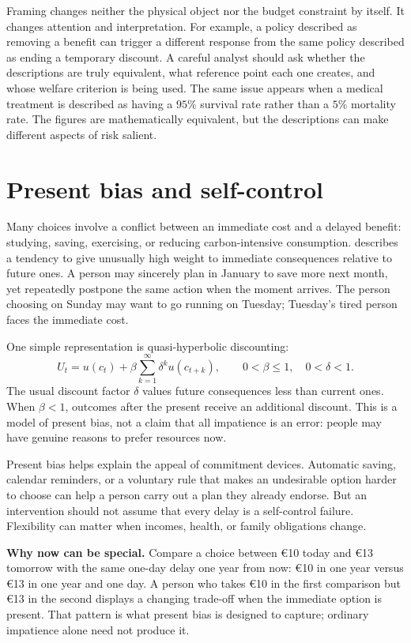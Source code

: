 Framing changes neither the physical object nor the budget constraint by
itself. It changes attention and interpretation. For example, a policy
described as removing a benefit can trigger a different response from the
same policy described as ending a temporary discount. A careful analyst should
ask whether the descriptions are truly equivalent, what reference point each
one creates, and whose welfare criterion is being used. The same issue appears
when a medical treatment is described as having a \(95\%\) survival rate rather
than a \(5\%\) mortality rate. The figures are mathematically equivalent, but
the descriptions can make different aspects of risk salient.

\section{Present bias and self-control}

Many choices involve a conflict between an immediate cost and a delayed
benefit: studying, saving, exercising, or reducing carbon-intensive
consumption.  describes a tendency to give unusually
high weight to immediate consequences relative to future ones. A person may
sincerely plan in January to save more next month, yet repeatedly postpone the
same action when the moment arrives. The person choosing on Sunday may want to
go running on Tuesday; Tuesday's tired person faces the immediate cost.

One simple representation is quasi-hyperbolic discounting:
\[
U_t=u(c_t)+\beta\sum_{k=1}^{\infty}\delta^k u(c_{t+k}),
\qquad
0<\beta\leq1,\quad 0<\delta<1.
\]
The usual discount factor \(\delta\) values future consequences less than
current ones. When \(\beta<1\), outcomes after the present receive an
additional discount. This is a model of present bias, not a claim that all
impatience is an error: people may have genuine reasons to prefer resources
now.

Present bias helps explain the appeal of commitment devices. Automatic saving,
calendar reminders, or a voluntary rule that makes an undesirable option
harder to choose can help a person carry out a plan they already endorse.
But an intervention should not assume that every delay is a self-control
failure. Flexibility can matter when incomes, health, or family obligations
change.

\begin{exercisebox}
\textbf{Why now can be special.}
Compare a choice between \euro10 today and \euro13 tomorrow with the same
one-day delay one year from now: \euro10 in one year versus \euro13 in one
year and one day. A person who takes \euro10 in the first comparison but
\euro13 in the second displays a changing trade-off when the immediate option
is present. That pattern is what present bias is designed to capture; ordinary
impatience alone need not produce it.
\end{exercisebox}


